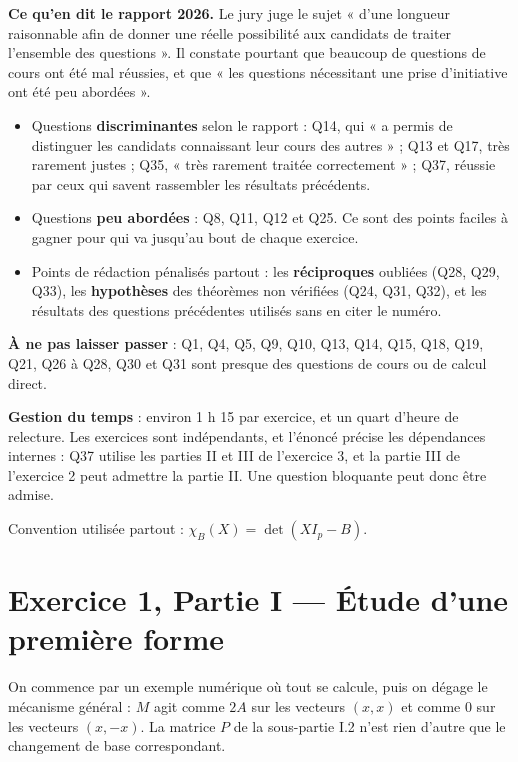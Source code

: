 \documentclass[11pt,a4paper]{article}
\providecommand{\tightlist}{\setlength{\itemsep}{0pt}\setlength{\parskip}{0pt}}
\begin{document}
\textbf{Ce qu'en dit le rapport 2026.} Le jury juge le sujet « d'une longueur raisonnable afin de donner une réelle possibilité aux candidats de traiter l'ensemble des questions ». Il constate pourtant que beaucoup de questions de cours ont été mal réussies, et que « les questions nécessitant une prise d'initiative ont été peu abordées ».

\begin{itemize}
\tightlist
\item
  Questions \textbf{discriminantes} selon le rapport : Q14, qui « a permis de distinguer les candidats connaissant leur cours des autres » ; Q13 et Q17, très rarement justes ; Q35, « très rarement traitée correctement » ; Q37, réussie par ceux qui savent rassembler les résultats précédents.
\item
  Questions \textbf{peu abordées} : Q8, Q11, Q12 et Q25. Ce sont des points faciles à gagner pour qui va jusqu'au bout de chaque exercice.
\item
  Points de rédaction pénalisés partout : les \textbf{réciproques} oubliées (Q28, Q29, Q33), les \textbf{hypothèses} des théorèmes non vérifiées (Q24, Q31, Q32), et les résultats des questions précédentes utilisés sans en citer le numéro.
\end{itemize}

\textbf{À ne pas laisser passer} : Q1, Q4, Q5, Q9, Q10, Q13, Q14, Q15, Q18, Q19, Q21, Q26 à Q28, Q30 et Q31 sont presque des questions de cours ou de calcul direct.

\textbf{Gestion du temps} : environ 1 h 15 par exercice, et un quart d'heure de relecture. Les exercices sont indépendants, et l'énoncé précise les dépendances internes : Q37 utilise les parties II et III de l'exercice 3, et la partie III de l'exercice 2 peut admettre la partie II. Une question bloquante peut donc être admise.

Convention utilisée partout : \(\chi_B(X)=\det(XI_p-B)\).

\hypertarget{exercice-1-partie-i-uxe9tude-dune-premiuxe8re-forme}{%
\section{Exercice 1, Partie I --- Étude d'une première forme}\label{exercice-1-partie-i-uxe9tude-dune-premiuxe8re-forme}}

On commence par un exemple numérique où tout se calcule, puis on dégage le mécanisme général : \(M\) agit comme \(2A\) sur les vecteurs \((x,x)\) et comme \(0\) sur les vecteurs \((x,-x)\). La matrice \(P\) de la sous-partie I.2 n'est rien d'autre que le changement de base correspondant.
\end{document}

